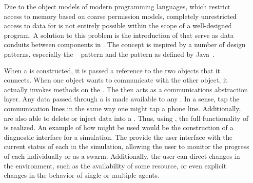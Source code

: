 Due to the object models of modern programming languages, which restrict access to memory based on coarse permission models, completely unrestricted access to data for  is not entirely possible within the scope of a well-designed program.  A solution to this problem is the introduction of  that serve as data conduits between components in \SWEEP{}.  The  concept is inspired by a number of design patterns, especially the ~\cite{GoF} pattern and the  pattern as defined by Java~\cite{karnold:Java}.  

When a  is constructed, it is passed a reference to the two objects that it connects.  When one object wants to communicate with the other object, it actually invokes methods on the .  The  then acts as a communications abstraction layer.  Any data passed through a  is made available to any .  In a sense,  tap the communication lines in the same way one might tap a phone line.  Additionally,  are also able to delete or inject data into a .  Thus, using , the full functionality of  is realized.  An example of how  might be used would be the construction of a diagnostic interface for a simulation.  The  provide the user interface with the current status of each  in the simulation, allowing the user to monitor the progress of each  individually or as a swarm.  Additionally, the user can direct changes in the environment, such as the availability of some resource, or even explicit changes in the behavior of single or multiple agents.
